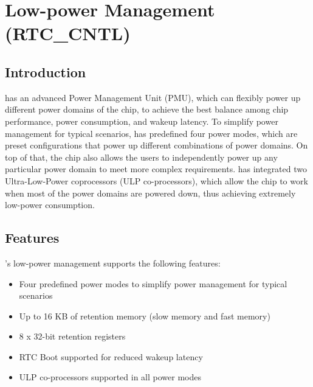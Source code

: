 \documentclass[main\_\_EN.tex]{subfiles}
\begin{document}

\ifglobal
\else
    {\let\clearpage\relax \listoftodos}
    \tableofcontents
\fi



\hypertarget{lowpowm}{}
\chapter{Low-power Management (RTC\_CNTL)}\label{mod:lowpowm}

\section{Introduction}

\chipname{} has an advanced Power Management Unit (PMU), which can flexibly power up different power domains of the chip, to achieve the best balance among chip performance, power consumption, and wakeup latency. To simplify power management for typical scenarios, \chipname{} has predefined four power modes, which are preset configurations that power up different combinations of power domains. On top of that, the chip also allows the users to independently power up any particular power domain to meet more complex requirements. \chipname{} has integrated two Ultra-Low-Power coprocessors (ULP co-processors), which allow the chip to work when most of the power domains are powered down, thus achieving extremely low-power consumption.

\section{Features}
\chipname{}'s low-power management supports the following features:
\begin{itemize}
    \item Four predefined power modes to simplify power management for typical scenarios
    \item Up to 16 KB of retention memory (slow memory and fast memory)
    \item 8 x 32-bit retention registers
    \item RTC Boot supported for reduced wakeup latency
    \item ULP co-processors supported in all power modes

\end{itemize}
\end{document}
